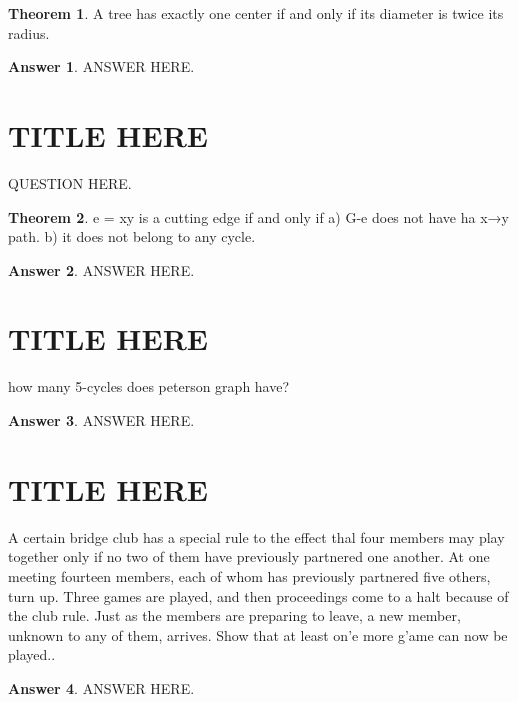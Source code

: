 \documentclass[a4paper]{article}
\renewcommand{\(}{\left(}
\renewcommand{\)}{\right)}
\theoremstyle{plain}
\theoremstyle{plain}
\theoremstyle{definition}
\newtheorem*{answer}{Answer}
\newtheorem{theorem}{Theorem}[section]
\begin{document}
\begin{theorem}
A tree has exactly one center if and only if its diameter is twice its radius.
\end{theorem}
\begin{shaded}
\begin{answer}
ANSWER HERE.
\end{answer}
\end{shaded}

\section{TITLE HERE}
QUESTION HERE.
\begin{theorem}
e = xy is a cutting edge if and only if
a) G-e does not have ha x→y path.
b) it does not belong to any cycle.
\end{theorem}
\begin{shaded}
\begin{answer}
ANSWER HERE.
\end{answer}
\end{shaded}

\section{TITLE HERE}
how many 5-cycles does peterson graph have?

\begin{shaded}
\begin{answer}
ANSWER HERE.
\end{answer}
\end{shaded}

\section{TITLE HERE}
A certain bridge club has a special rule to the effect thal four members may play together only if
no two of them have previously partnered one another. At one meeting fourteen members, each of
whom has previously partnered five others, turn up. Three games are played, and then proceedings
come to a halt because of the club rule. Just as the members are preparing to leave, a new member,
unknown to any of them, arrives. Show that at least on'e more g'ame can now be played..
\begin{shaded}
\begin{answer}
ANSWER HERE.
\end{answer}
\end{shaded}
\end{document}
